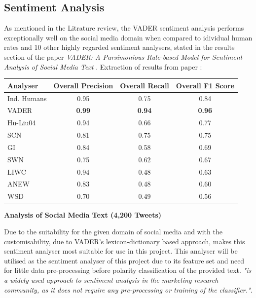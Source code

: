 \documentclass[oneside, 12pt]{article}
\begin{document}
		\subsection{Sentiment Analysis}
		As mentioned in the Litrature review, the VADER sentiment analysis performs exceptionally well on the social media domain when compared to idividual human rates and 10 other highly regarded sentiment analysers, stated in the results section of the paper \textit{VADER: A Parsimonious Rule-based Model for Sentiment Analysis of Social Media Text} \cite{VADERPaper}. \newline Extraction of results from paper \cite{VADERPaper}:

		\begin{center}
			\begin{tabular}{l|c|c|c}
				\textbf{Analyser} & \textbf{Overall Precision} & \textbf{Overall Recall} & \textbf{Overall F1 Score}\\
				\hline
				\multirow{1}{*}{Ind. Humans} & 0.95 & 0.75 & 0.84 \\
				\multirow{1}{*}{VADER} & \textbf{0.99} & \textbf{0.94} & \textbf{0.96} \\
				\multirow{1}{*}{Hu-Liu04} & 0.94 & 0.66 & 0.77 \\
				\multirow{1}{*}{SCN} & 0.81 & 0.75 & 0.75 \\
				\multirow{1}{*}{GI} & 0.84 & 0.58 & 0.69 \\
				\multirow{1}{*}{SWN} & 0.75 & 0.62 & 0.67 \\
				\multirow{1}{*}{LIWC} & 0.94 & 0.48 & 0.63 \\
				\multirow{1}{*}{ANEW} & 0.83 & 0.48 & 0.60 \\
				\multirow{1}{*}{WSD} & 0.70 & 0.49 & 0.56 \\
			\end{tabular}
		
				\textbf{Analysis of Social Media Text (4,200 Tweets)}\cite{VADERPaper}
		\end{center}
		
		Due to the suitability for the given domain of social media and with the customisability, due to VADER's lexicon-dictionary based approach, makes this sentiment analyser most suitable for use in this project. This analyser will be utilised as the sentiment analyser of this project due to its feature set and need for little data pre-processing before polarity classification of the provided text. \cite{LexiconSocSent} \textit{"is a widely used approach to sentiment analysis in the marketing research community, as it does not require any pre-processing or training of the classifier."}.
		
\end{document}

